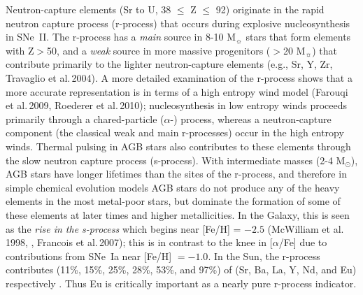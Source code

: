 \documentclass{emulateapj}
\newcommand\etal{{\rm et al.\,}}
\begin{document}
Neutron-capture elements (Sr to U, 38 $\le$ Z $\le$ 92) originate
in the rapid neutron capture process (r-process) that occurs during 
explosive nucleosynthesis in SNe~II. 
The r-process has a {\it main} source in 
8-10 M$_\sun$ stars that form elements with Z$>$50, and 
a {\it weak} source in more massive 
progenitors ($>$20 M$_\sun$) that contribute primarily 
to the lighter neutron-capture elements (e.g., Sr, Y, Zr,
Travaglio \etal  2004).  A more detailed examination of
the r-process shows that a more accurate representation 
is in terms of a high entropy wind model 
(Farouqi \etal 2009, Roederer \etal 2010); 
nucleosynthesis in low entropy winds proceeds primarily
through a chared-particle ($\alpha$-) process, whereas
a neutron-capture component (the classical weak and main 
r-processes) occur in the high entropy winds.
%
Thermal pulsing in AGB stars also contributes to these elements
through the slow neutron capture process (s-process).
With intermediate masses (2-4 M$_\odot$), AGB stars have 
longer lifetimes than the sites of the r-process, and 
therefore in simple chemical evolution models AGB stars do 
not produce any of the heavy elements in the most 
metal-poor stars, but dominate the formation of some
of these elements at later times and higher metallicities.
%   
In the Galaxy, this is seen as the {\it rise in the s-process} 
which begins near
[Fe/H] = $-2.5$ (McWilliam \etal  1998, \citealt{Bur00}, 
Francois \etal  2007);  this is in contrast to the knee in
[$\alpha$/Fe] due to contributions from SNe~Ia 
near [Fe/H] $= -1.0$. 
%
%
%
In the Sun, the r-process contributes (11\%, 15\%, 25\%, 28\%, 53\%, 
and 97\%) of (Sr, Ba, La, Y, Nd, and Eu) respectively \citep{Bur00}.
Thus Eu is critically important as a nearly pure r-process indicator.
\end{document}
